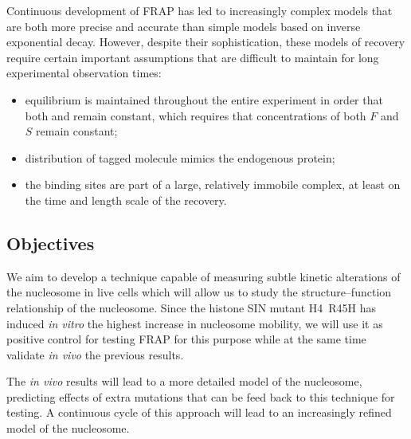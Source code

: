     Continuous development of FRAP has led to increasingly complex models
    that are both more precise and accurate than simple models based on
    inverse exponential decay.
    However, despite their sophistication, these models of recovery require
    certain important assumptions that are difficult to maintain for long
    experimental observation times:

    \begin{itemize}
      \item equilibrium is maintained throughout the entire experiment in
            order that both \Kon{} and \Koff{} remain constant, which requires
            that concentrations of both $F$ and $S$ remain constant;
      \item distribution of tagged molecule mimics the endogenous protein;
      \item the binding sites are part of a large, relatively immobile complex,
            at least on the time and length scale of the recovery.
    \end{itemize}

  \subsection{Objectives}

    We aim to develop a technique capable of measuring subtle kinetic
    alterations of the nucleosome in live cells which will allow us to study the
    structure--function relationship of the nucleosome.
    Since the histone SIN mutant H4~R45H has induced \textit{in vitro} the
    highest increase in nucleosome mobility, we will use it as positive
    control for testing FRAP for this purpose while at the same time
    validate \textit{in vivo} the previous results.

    The \textit{in vivo} results will lead to a more detailed model of the
    nucleosome, predicting effects of extra mutations that can be feed back
    to this technique for testing. A continuous cycle of this approach will
    lead to an increasingly refined model of the nucleosome.

